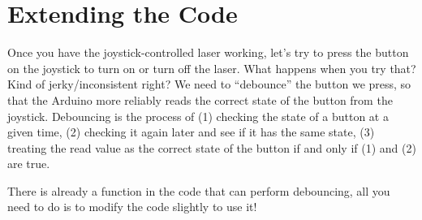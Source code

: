 \documentclass{article}
\begin{document}
\section{ Extending the Code}
Once you have the joystick-controlled laser working, let’s try to press the button on the joystick
to turn on or turn off the laser. What happens when you try that? Kind of jerky/inconsistent right?
We need to ``debounce'' the button we press, so that the Arduino more reliably reads the correct
state of the button from the joystick. Debouncing is the process of (1) checking the state of a
button at a given time, (2) checking it again later and see if it has the same state, (3) treating
the read value as the correct state of the button if and only if (1) and (2) are true.

There is already a function in the code that can perform debouncing, all you need to do is to modify
the code slightly to use it!
\end{document}
